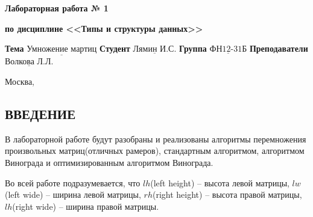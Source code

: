 \documentclass[14pt]{article}
\begin{document}
	\vspace{1cm}
	
	\begin{center}
		\noindent\centering
		\Large\textbf{Лабораторная работа № 1}
		
	\end{center}
	\begin{center}
		\noindent\centering
		\Large\textbf{по дисциплине <<Типы и структуры данных>>}
	\end{center}
	
	\noindent\textbf{Тема} $\underline{\text{Умножение мартиц}}$\newline\newline
	\noindent\textbf{Студент} $\underline{\text{Лямин И.С.}}$\newline\newline
	\noindent\textbf{Группа} $\underline{\text{ФН12-31Б}}$\newline\newline
	\noindent\textbf{Преподаватели} $\underline{\text{Волкова Л.Л.}}$\newline
	
	\begin{center}
		\vfill
		Москва,~\the\year 
	\end{center}
	\clearpage
	

	\renewcommand{\contentsname}{\centering{СОДЕРЖАНИЕ}}
	\setcounter{page}{2}
	\tableofcontents
	
	\newpage
	\begin{center}
		\section*{ВВЕДЕНИЕ} 
	\end{center}
	
	В лабораторной работе будут разобраны и реализованы алгоритмы перемножения произвольных матриц(отличных рамеров), стандартным алгоритмом, алгоритмом Винограда и оптимизированным алгоритмом Винограда.
	
	Во всей работе подразумевается, что $lh$(left height) -- высота левой матрицы, $lw$(left wide) -- ширина левой матрицы, $rh$(right height) -- высота правой матрицы, $lh$(right wide) -- ширина правой матрицы.   
	
\end{document}
